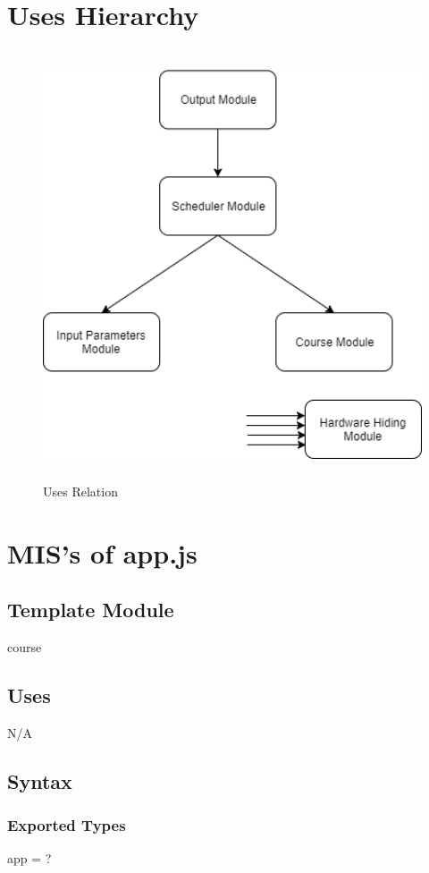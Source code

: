 \documentclass[11pt, oneside]{article}
\begin{document}
\newpage
\section{Uses Hierarchy}

\begin{figure}[h]
    \centering
    \includegraphics[height=127mm]{Attachments/UsesRelation.png}
    \caption{Uses Relation}
    \label{fig:my_label}
\end{figure}


\newpage

\section{MIS's of app.js}
\subsection*{Template Module}
course
\subsection* {Uses}
N/A
\subsection* {Syntax}
\subsubsection* {Exported Types}
app = ?
\end{document}
